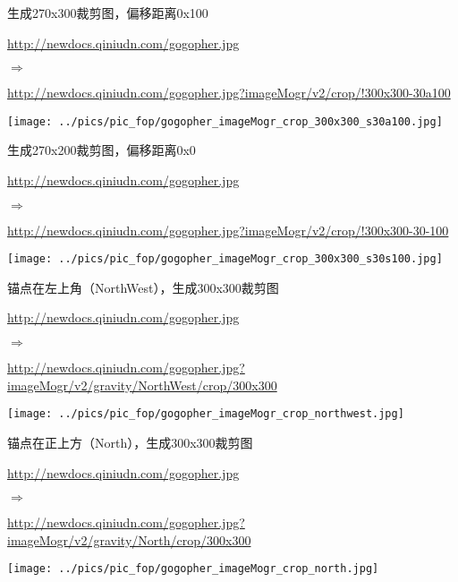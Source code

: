 \documentclass[11pt, oneside]{book}
\newcommand{\qsym}[1]{
\footnotesize
\noindent
#1\par
\normalsize
}
\newcommand{\qsamplelink}[1]{
\vspace{0.2em}
\noindent
#1\par
\vspace{0.1em}
}
\newcommand{\qurl}[1]{\footnotesize\url{#1}\normalsize}
\begin{document}
\begin{sample}
  \caption{生成270x300裁剪图，偏移距离0x100}
    \qsamplelink{\qurl{http://newdocs.qiniudn.com/gogopher.jpg}}
    \qsym{$\Rightarrow$}
    \qsamplelink{\qurl{http://newdocs.qiniudn.com/gogopher.jpg?imageMogr/v2/crop/!300x300-30a100}}

    \begin{center}
      \texttt{[image: ../pics/pic\_fop/gogopher\_imageMogr\_crop\_300x300\_s30a100.jpg]}
    \end{center}
  \label{imageMogr-crop-300x300-s30a100}
\end{sample}

\begin{sample}
  \caption{生成270x200裁剪图，偏移距离0x0}
    \qsamplelink{\qurl{http://newdocs.qiniudn.com/gogopher.jpg}}
    \qsym{$\Rightarrow$}
    \qsamplelink{\qurl{http://newdocs.qiniudn.com/gogopher.jpg?imageMogr/v2/crop/!300x300-30-100}}

    \begin{center}
      \texttt{[image: ../pics/pic\_fop/gogopher\_imageMogr\_crop\_300x300\_s30s100.jpg]}
    \end{center}
  \label{imageMogr-crop-300x300-s30s100}
\end{sample}

\begin{sample}
  \caption{锚点在左上角（NorthWest），生成300x300裁剪图}
    \qsamplelink{\qurl{http://newdocs.qiniudn.com/gogopher.jpg}}
    \qsym{$\Rightarrow$}
    \qsamplelink{\qurl{http://newdocs.qiniudn.com/gogopher.jpg?imageMogr/v2/gravity/NorthWest/crop/300x300}}

    \begin{center}
      \texttt{[image: ../pics/pic\_fop/gogopher\_imageMogr\_crop\_northwest.jpg]}
    \end{center}
  \label{imageMogr-crop-northwest}
\end{sample}

\begin{sample}
  \caption{锚点在正上方（North），生成300x300裁剪图}
    \qsamplelink{\qurl{http://newdocs.qiniudn.com/gogopher.jpg}}
    \qsym{$\Rightarrow$}
    \qsamplelink{\qurl{http://newdocs.qiniudn.com/gogopher.jpg?imageMogr/v2/gravity/North/crop/300x300}}

    \begin{center}
      \texttt{[image: ../pics/pic\_fop/gogopher\_imageMogr\_crop\_north.jpg]}
    \end{center}
  \label{imageMogr-crop-north}
\end{sample}
\end{document}
